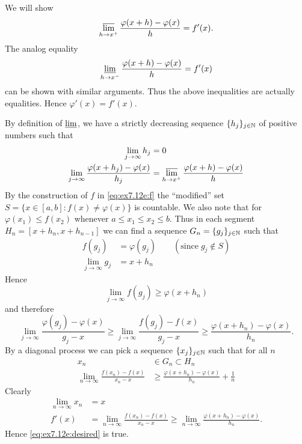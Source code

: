 \begin{enumerate}
\begin{itemize}
We will show 
\begin{equation} \label{eq:ex7.12e:desired}
\varlimsup_{h\to x^+} \frac{\varphi(x+h) - \varphi(x)}{h} = f'(x).
\end{equation}
The analog equality
\begin{equation*}
\varliminf_{h\to x^-} \frac{\varphi(x+h) - \varphi(x)}{h}  = f'(x)
\end{equation*}
can be shown with similar arguments. Thus the above inequalities
are actually equalities. Hence \(\varphi'(x) = f'(x)\).

By definition of \(\varliminf\), we have
a strictly decreasing sequence 
\(\{h_j\}_{j\in\mathbb{N}}\) 
of positive numbers
such that
\begin{align*}
\lim_{j\to\infty} h_j &= 0 \\
\lim_{j\to\infty} \frac{\varphi(x+h_j) - \varphi(x)}{h_j}
&=\varlimsup_{h\to x^+} \frac{\varphi(x+h) - \varphi(x)}{h}
\end{align*}
By the construction of $f$ in \eqref{eq:ex7.12e:f} 
the ``modified'' set \(S=\{x\in[a,b]: f(x)\neq \varphi(x)\}\)
is countable.
We also note that for \(\varphi(x_1) \leq f(x_2)\)
whenever \(a\leq x_1\leq x_2 \leq b\).
Thus in each segment \(H_n = [x + h_{n}, x + h_{n-1}]\)
we can find a sequence \(G_n = \{g_j\}_{j\in\mathbb{N}}\) such that
\begin{align*}
f(g_j) &= \varphi(g_j) \qquad (\mathrm{since}\;g_j\notin S) \\
\lim_{j\to\infty} g_j &= x + h_{n} 
\end{align*}
Hence
\begin{equation*}
\lim_{j\to\infty} f(g_j) \geq \varphi(x + h_{n})
\end{equation*}
and therefore
\begin{equation*}
\lim_{j\to\infty} \frac{\varphi(g_j) - \varphi(x)}{g_j - x}
 \geq \lim_{j\to\infty} \frac{f(g_j) - f(x)}{g_j - x}
 \geq \frac{\varphi(x+h_{n}) - \varphi(x)}{h_{n}}.
\end{equation*}
By a diagonal process we can pick 
a sequence \(\{x_j\}_{j\in\mathbb{N}}\) such that for all $n$
\begin{align*}
x_n &\in G_n \subset H_n \\
\lim_{n\to\infty} \frac{f(x_n) - f(x)}{x_n - x}
&\geq  \frac{\varphi(x+h_{n}) - \varphi(x)}{h_{n}} + \frac{1}{n}
\end{align*}
Clearly 
\begin{align*}
\lim_{n\to\infty} x_n &= x \\
f'(x) &= \lim_{n\to\infty} \frac{f(x_n) - f(x)}{x_n - x}
 \geq  \lim_{n\to\infty} \frac{\varphi(x+h_{n}) - \varphi(x)}{h_{n}}.
\end{align*}
Hence \eqref{eq:ex7.12e:desired} is true.


\end{itemize}
\end{enumerate}
